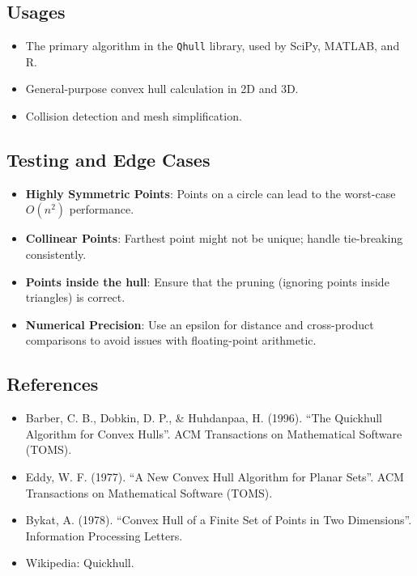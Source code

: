 \subsection{Usages}

\begin{itemize}
\item The primary algorithm in the \texttt{Qhull} library, used by SciPy, MATLAB, and R.
\item General-purpose convex hull calculation in 2D and 3D.
\item Collision detection and mesh simplification.
\end{itemize}

\subsection{Testing and Edge Cases}

\begin{itemize}
\item \textbf{Highly Symmetric Points}: Points on a circle can lead to the worst-case $O(n^2)$ performance.
\item \textbf{Collinear Points}: Farthest point might not be unique; handle tie-breaking consistently.
\item \textbf{Points inside the hull}: Ensure that the pruning (ignoring points inside triangles) is correct.
\item \textbf{Numerical Precision}: Use an epsilon for distance and cross-product comparisons to avoid issues with floating-point arithmetic.
\end{itemize}

\subsection{References}

\begin{itemize}
\item Barber, C. B., Dobkin, D. P., \& Huhdanpaa, H. (1996). ``The Quickhull Algorithm for Convex Hulls''. ACM Transactions on Mathematical Software (TOMS).
\item Eddy, W. F. (1977). ``A New Convex Hull Algorithm for Planar Sets''. ACM Transactions on Mathematical Software (TOMS).
\item Bykat, A. (1978). ``Convex Hull of a Finite Set of Points in Two Dimensions''. Information Processing Letters.
\item Wikipedia: Quickhull.
\end{itemize}


